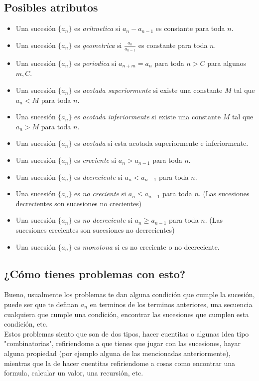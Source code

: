 \documentclass[11pt]{scrartcl}
\begin{document}
\subsection{Posibles atributos}
\begin{itemize}
\item Una sucesi\'on $\{a_n\}$ es \textit{aritmetica} si $a_n-a_{n-1}$ es constante para toda $n$.
\item Una sucesi\'on $\{a_n\}$ es \textit{geometrica} si $\frac{a_n}{a_{n-1}}$ es constante para toda $n$.
\item Una sucesi\'on $\{a_n\}$ es \textit{periodica} si $a_{n+m}=a_n$ para toda $n>C$ para algunos $m,C$.
\item Una sucesi\'on $\{a_n\}$ es \textit{acotada superiormente} si existe una constante $M$ tal que $a_n < M$ para toda $n$.
\item Una sucesi\'on $\{a_n\}$ es \textit{acotada inferiormente} si existe una constante $M$ tal que $a_n > M$ para toda $n$.
\item Una sucesi\'on $\{a_n\}$ es \textit{acotada} si esta acotada superiormente e inferiormente.
\item Una sucesi\'on $\{a_n\}$ es \textit{creciente} si $a_n>a_{n-1}$ para toda $n$.
\item Una sucesi\'on $\{a_n\}$ es \textit{decreciente} si $a_n < a_{n-1}$ para toda $n$.
\item Una sucesi\'on $\{a_n\}$ es \textit{no creciente} si $a_n \leq a_{n-1}$ para toda $n$. (Las sucesiones decrecientes son sucesiones no crecientes)
\item Una sucesi\'on $\{a_n\}$ es \textit{no decreciente} si $a_n \geq a_{n-1}$ para toda $n$. (Las sucesiones crecientes son sucesiones no decrecientes)
\item Una sucesi\'on $\{a_n\}$ es \textit{monotona} si es no creciente o no decreciente.
\end{itemize}


\subsection{¿C\'omo tienes problemas con esto?}

Bueno, usualmente los problemas te dan alguna condici\'on que cumple la sucesi\'on, puede ser
que te definan $a_n$ en terminos de los terminos anteriores, una secuencia cualquiera que cumple una condici\'on,
encontrar las sucesiones que cumplen esta condici\'on, etc. \\

Estos problemas siento que son de dos tipos, hacer cuentitas o algunas idea tipo "combinatorias", refiriendome a que tienes que 
jugar con las sucesiones, hayar alguna propiedad (por ejemplo alguna de las mencionadas anteriormente), mientras que la de hacer cuentitas 
refiriendome a cosas como encontrar una formula, calcular un valor, una recursi\'on, etc. 
\end{document}
